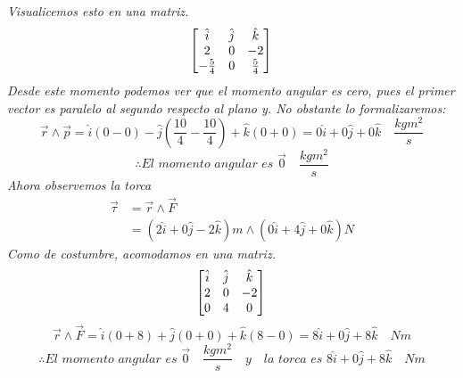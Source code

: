 \documentclass{article}
\begin{document}
\textit{Visualicemos esto en una matriz.}
$$\begin{bmatrix}
    \hat{i} & \hat{j} & \hat{k} \\
    2 & 0 & -2 \\
    -\frac{5}{4} & 0 & \frac{5}{4} \\
    \end{bmatrix} \\$$
\textit{Desde este momento podemos ver que el momento angular es cero, pues el primer vector es paralelo al segundo respecto al plano y. No obstante lo formalizaremos:}
\[ \vec{r} \land \vec{p} = \hat{i}(0-0) - \hat{j}\left(\frac{10}{4}-\frac{10}{4}\right) + \hat{k}(0 + 0) = 0\hat{i} + 0\hat{j} + 0\hat{k} \quad \frac{kgm^2}{s}\]
\[ \therefore \textit{El momento angular es }\vec{0} \quad \frac{kgm^2}{s} \]
\textit{Ahora observemos la torca}
\begin{align*}
    \vec{\tau} &= \vec{r} \land \vec{F} \\
    &= (2\hat{i} + 0\hat{j} - 2\hat{k})m \land (0\hat{i} + 4\hat{j} + 0\hat{k})N
\end{align*}
\textit{Como de costumbre, acomodamos en una matriz.}
$$\begin{bmatrix}
    \hat{i} & \hat{j} & \hat{k} \\
    2 & 0 & -2 \\
    0 & 4 & 0 \\
    \end{bmatrix} \\$$
    \[ \vec{r} \land \vec{F} = \hat{i}(0+8) + \hat{j}(0+0) + \hat{k}(8-0) = 8\hat{i} + 0\hat{j} + 8\hat{k} \quad Nm \]
    \[ \therefore \textit{El momento angular es } \vec{0} \quad \frac{kgm^2}{s} \quad y \quad \textit{la torca es } 8\hat{i} + 0\hat{j} + 8\hat{k} \quad Nm \]
    \newpage
\end{document}
